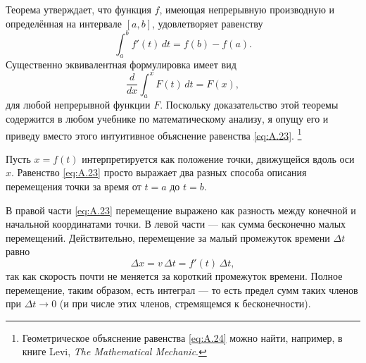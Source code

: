 Теорема утверждает, что функция $f$, имеющая непрерывную производную и определённая на интервале $[a,b]$, удовлетворяет равенству
\begin{equation}
\int_a^b f'(t)\,dt = f(b) - f(a).
\label{eq:A.23}
\end{equation}
Существенно эквивалентная формулировка имеет вид
\begin{equation}
\frac{d}{dx} \int_a^x F(t)\,dt = F(x),
\label{eq:A.24}
\end{equation}
для любой непрерывной функции $ F $.
Поскольку доказательство этой теоремы содержится в любом учебнике по математическому анализу, я опущу его и приведу вместо этого интуитивное объяснение равенства \eqref{eq:A.23}.%
\footnote{Геометрическое объяснение равенства \eqref{eq:A.24} можно найти, например, в книге Levi, \emph{The Mathematical Mechanic}.}

Пусть $x = f(t)$ интерпретируется как положение точки, движущейся вдоль оси $x$.
Равенство \eqref{eq:A.23} просто выражает два разных способа описания перемещения точки за время от $t=a$ до $t=b$.

В правой части \eqref{eq:A.23} перемещение выражено как разность между конечной и начальной координатами точки.
В левой части — как сумма бесконечно малых перемещений.
Действительно, перемещение за малый промежуток времени $\Delta t$ равно
\[\Delta x = v\,\Delta t = f'(t)\,\Delta t,\]
так как скорость почти не меняется за короткий промежуток времени.
Полное перемещение, таким образом, есть интеграл — то есть предел сумм таких членов при $\Delta t\to0$ (и при числе этих членов, стремящемся к бесконечности).
